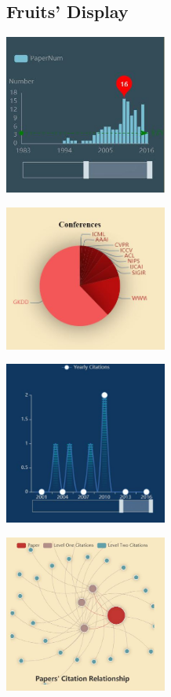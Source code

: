 \documentclass[10pt,twoside,a4paper,titlepage]{article}
\begin{document}
		

	\subsection{Fruits' Display}
		\includegraphics[width=0.4\textwidth]{gjl/11.jpg}\newline\par
		\includegraphics[width=0.4\textwidth]{gjl/12.jpg}\newline\par
		\includegraphics[width=0.4\textwidth]{gjl/21.jpg}\newline\par
		\includegraphics[width=0.4\textwidth]{gjl/22.jpg}\newline\par
\end{document}
